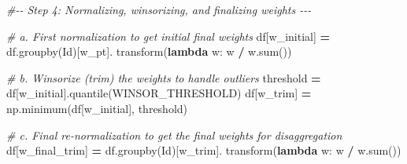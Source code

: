 \documentclass[
  12pt,
  oneside]{book}
\newenvironment{Shaded}{\begin{snugshade}}{\end{snugshade}}
\newcommand{\BuiltInTok}[1]{#1}
\newcommand{\CommentTok}[1]{\textcolor[rgb]{0.56,0.35,0.01}{\textit{#1}}}
\newcommand{\KeywordTok}[1]{\textcolor[rgb]{0.13,0.29,0.53}{\textbf{#1}}}
\newcommand{\NormalTok}[1]{#1}
\newcommand{\OperatorTok}[1]{\textcolor[rgb]{0.81,0.36,0.00}{\textbf{#1}}}
\newcommand{\StringTok}[1]{\textcolor[rgb]{0.31,0.60,0.02}{#1}}
\begin{document}
\begin{Shaded}
\begin{Highlighting}[numbers=left,,]
\CommentTok{\#{-}{-} Step 4: Normalizing, winsorizing, and finalizing weights {-}{-}{-}}

\CommentTok{\# a. First normalization to get initial final weights}
\NormalTok{df[}\StringTok{\textquotesingle{}w\_initial\textquotesingle{}}\NormalTok{] }\OperatorTok{=}\NormalTok{ df.groupby(}\StringTok{\textquotesingle{}Id\textquotesingle{}}\NormalTok{)[}\StringTok{\textquotesingle{}w\_pt\textquotesingle{}}\NormalTok{].}
\NormalTok{transform(}\KeywordTok{lambda}\NormalTok{ w: w }\OperatorTok{/}\NormalTok{ w.}\BuiltInTok{sum}\NormalTok{())}

\CommentTok{\# b. Winsorize (trim) the weights to handle outliers}
\NormalTok{threshold }\OperatorTok{=}\NormalTok{ df[}\StringTok{\textquotesingle{}w\_initial\textquotesingle{}}\NormalTok{].quantile(WINSOR\_THRESHOLD)}
\NormalTok{df[}\StringTok{\textquotesingle{}w\_trim\textquotesingle{}}\NormalTok{] }\OperatorTok{=}\NormalTok{ np.minimum(df[}\StringTok{\textquotesingle{}w\_initial\textquotesingle{}}\NormalTok{], threshold)}

\CommentTok{\# c. Final re{-}normalization to get the final weights for disaggregation}
\NormalTok{df[}\StringTok{\textquotesingle{}w\_final\_trim\textquotesingle{}}\NormalTok{] }\OperatorTok{=}\NormalTok{ df.groupby(}\StringTok{\textquotesingle{}Id\textquotesingle{}}\NormalTok{)[}\StringTok{\textquotesingle{}w\_trim\textquotesingle{}}\NormalTok{].}
\NormalTok{transform(}\KeywordTok{lambda}\NormalTok{ w: w }\OperatorTok{/}\NormalTok{ w.}\BuiltInTok{sum}\NormalTok{())}
\end{Highlighting}
\end{Shaded}

\enddocument

\printbibliography
\end{document}
